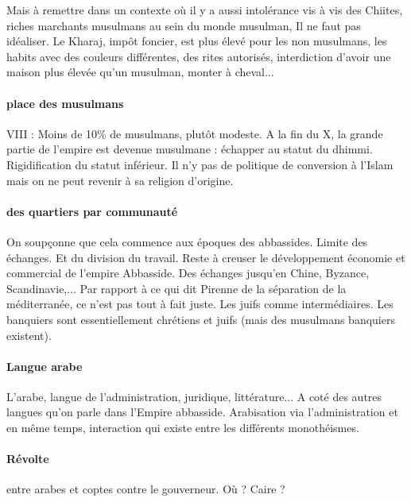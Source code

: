 Mais à remettre dans un contexte où il y a aussi intolérance vis à vis des Chiites, riches marchants musulmans au sein du monde musulman,  Il ne faut pas idéaliser. Le Kharaj, impôt foncier, est plus élevé pour les non musulmans, les habits avec des couleurs différentes, des rites autorisés, interdiction d'avoir une maison plus élevée qu'un musulman, monter à cheval...

\paragraph{place des musulmans}
VIII : Moins de 10\% de musulmans, plutôt modeste. A la fin du X, la grande partie de l'empire est devenue musulmane : échapper au statut du dhimmi. Rigidification du statut inférieur. Il n'y pas de politique de conversion à l'Islam mais on ne peut revenir à sa religion d'origine.  

\paragraph{des quartiers par communauté} On soupçonne que cela commence aux époques des abbassides. Limite des échanges. Et du division du travail. Reste à creuser le développement économie et commercial de l'empire Abbasside. Des échanges jusqu'en Chine, Byzance, Scandinavie,...
Par rapport à ce qui dit Pirenne de la séparation de la méditerranée, ce n'est pas tout à fait juste. Les juifs comme intermédiaires.
Les banquiers sont essentiellement chrétiens et juifs (mais des musulmans banquiers existent).


\paragraph{Langue arabe} L'arabe, langue de l'administration, juridique, littérature... A coté des autres langues qu'on parle dans l'Empire abbasside. Arabisation via l'administration et en même temps, interaction qui existe entre les différents monothéismes. 

\paragraph{Révolte} entre arabes et coptes contre le gouverneur.  Où ? Caire ? 





